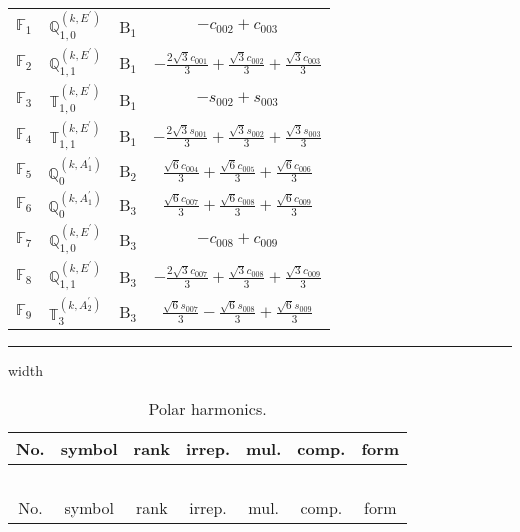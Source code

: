 \documentclass[fleqn,10pt,landscape]{article}
\begin{document}
\begin{itemize}
\begin{center}
\begin{longtable}{c|c|c|c}
$ \mathbb{F}_{1} $ & $\mathbb{Q}_{1,0}^{(k,E^{\prime})}$ & B$_{1}$ & $- c_{002} + c_{003}$ \\
$ \mathbb{F}_{2} $ & $\mathbb{Q}_{1,1}^{(k,E^{\prime})}$ & B$_{1}$ & $- \frac{2 \sqrt{3} c_{001}}{3} + \frac{\sqrt{3} c_{002}}{3} + \frac{\sqrt{3} c_{003}}{3}$ \\
$ \mathbb{F}_{3} $ & $\mathbb{T}_{1,0}^{(k,E^{\prime})}$ & B$_{1}$ & $- s_{002} + s_{003}$ \\
$ \mathbb{F}_{4} $ & $\mathbb{T}_{1,1}^{(k,E^{\prime})}$ & B$_{1}$ & $- \frac{2 \sqrt{3} s_{001}}{3} + \frac{\sqrt{3} s_{002}}{3} + \frac{\sqrt{3} s_{003}}{3}$ \\ \hline
$ \mathbb{F}_{5} $ & $\mathbb{Q}_{0}^{(k,A_{1}^{\prime})}$ & B$_{2}$ & $\frac{\sqrt{6} c_{004}}{3} + \frac{\sqrt{6} c_{005}}{3} + \frac{\sqrt{6} c_{006}}{3}$ \\ \hline
$ \mathbb{F}_{6} $ & $\mathbb{Q}_{0}^{(k,A_{1}^{\prime})}$ & B$_{3}$ & $\frac{\sqrt{6} c_{007}}{3} + \frac{\sqrt{6} c_{008}}{3} + \frac{\sqrt{6} c_{009}}{3}$ \\
$ \mathbb{F}_{7} $ & $\mathbb{Q}_{1,0}^{(k,E^{\prime})}$ & B$_{3}$ & $- c_{008} + c_{009}$ \\
$ \mathbb{F}_{8} $ & $\mathbb{Q}_{1,1}^{(k,E^{\prime})}$ & B$_{3}$ & $- \frac{2 \sqrt{3} c_{007}}{3} + \frac{\sqrt{3} c_{008}}{3} + \frac{\sqrt{3} c_{009}}{3}$ \\
$ \mathbb{F}_{9} $ & $\mathbb{T}_{3}^{(k,A_{2}^{\prime})}$ & B$_{3}$ & $\frac{\sqrt{6} s_{007}}{3} - \frac{\sqrt{6} s_{008}}{3} + \frac{\sqrt{6} s_{009}}{3}$ \\
\end{longtable}
\end{center}

 \hfil \hrule height 1mm width \textwidth \hfil

\begin{center}
\renewcommand{\arraystretch}{1.3}
\begin{longtable}{ccccccc}
\caption{Polar harmonics.}
 \\
 \hline \hline
No. & symbol & rank & irrep. & mul. & comp. & form \\ \hline \endfirsthead

\multicolumn{6}{l}{\tablename\ \thetable{}} \\
 \hline \hline
No. & symbol & rank & irrep. & mul. & comp. & form \\ \hline \endhead


\end{longtable}
\end{center}
\end{itemize}
\end{document}
